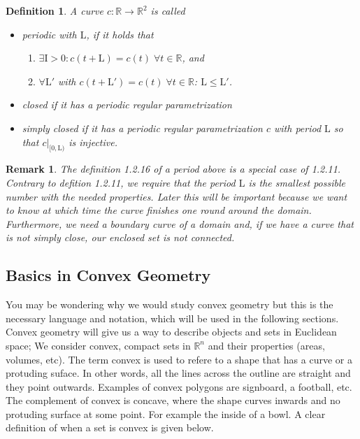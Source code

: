 \documentclass[a4paper]{book}
\newtheorem{remark}[theorem]{Remark}%
\newtheorem{definition}[theorem]{Definition}%
\numberwithin{theorem}{section}%
\begin{document}
\begin{definition}
    A curve $c:\mathbb{R}\to\mathbb{R}^{2}$ is called
    \begin{itemize}
        \item periodic with $\mathrm{L}$, if it holds that
        \begin{enumerate}
            \item $\exists\mathrm{I}>0: c(t+\mathrm{L})=c(t)\;\forall t\in\mathbb{R}$, and
            \item $\forall\mathrm{L}'$ with $c(t+\mathrm{L}')=c(t)\;\forall t\in\mathbb{R}$: $\mathrm{L}\leq\mathrm{L}'$.
        \end{enumerate}
        \item closed if it has a periodic regular parametrization
        \item simply closed if it has a periodic regular parametrization $c$ with period $\mathrm{L}$ so that $c|_{[0,\mathrm{L})}$ is injective.
    \end{itemize}
\end{definition}

\begin{remark}
    The definition 1.2.16 of a period above is a special case of 1.2.11. Contrary to defition 1.2.11, we require that the period $\mathrm{L}$ is the smallest possible number with the needed properties. Later this will be important because we want to know at which time the curve finishes one round around the domain. Furthermore, we need a boundary curve of a domain and, if we have a curve that is not simply close, our enclosed set is not connected.
\end{remark}

\subsection{Basics in Convex Geometry}
You may be wondering why we would study convex geometry but this is the necessary language and notation, which will be used in the following sections. Convex geometry will give us a way to describe objects and sets in Euclidean space; We consider convex, compact sets in $\mathbb{R}^n$ and their properties (areas, volumes, etc). The term convex is used to refere to a shape that has a curve or a protuding suface. In other words, all the lines across the outline are straight and they point outwards. Examples of convex polygons are signboard, a football, etc. The complement of convex is concave, where the shape curves inwards and no protuding surface at some point. For example the inside of a bowl. A clear definition of when a set is convex is given below. 
\end{document}

